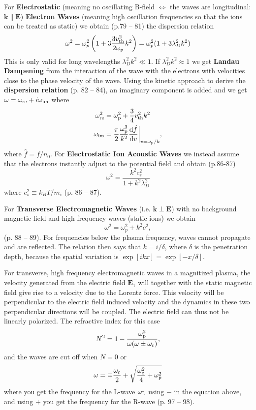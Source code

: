 \documentclass[10pt,landscape]{article}
\renewcommand{\vec}{\bm}
\newcommand{\topiccolor}{green}
\newcommand{\cbf}[1]{\textcolor{\topiccolor!80!black}{\textbf{#1}}}
\begin{document}
\begin{multicols*}{3}
For \cbf{Electrostatic} (meaning no oscillating B-field $\iff$ the waves
are longitudinal: $\vec k \parallel \vec E$)
\cbf{Electron Waves} (meaning high oscillation frequencies so that the ions
can be treated as static) we obtain (p.79 -- 81) the dispersion relation
\begin{equation*}
	\omega^2 = \omega_p^2 \left(1 + 3 \frac{3v_{\rm th}^2}{2 \omega_{\rm p}} k^2\right) = \omega_p^2 (1 + 3 \lambda_D^2 k^2)
\end{equation*}
This is only valid for long wavelengths $\lambda_D^2 k^2 \ll 1$.
If $\lambda_D^2 k^2 \approx 1$ we get \cbf{Landau Dampening}
from the interaction of the wave with the electrons with velocities close to the
phase velocity of the wave.
Using the kinetic approach to derive the \cbf{dispersion relation} (p. 82 -- 84), an imaginary
component is added and we get $\omega=\omega_{\rm re} + i\omega_{\rm im}$ where
\begin{align*}
	\omega_{\rm re}^2 &= \omega_{\rm p}^2 + \frac34 v_{\rm th}^2k^2 \\
	\omega_{\rm im} &= \frac\pi2 \frac{\omega_{\rm p}^3}{k^2}\diff{\hat{f}}{v}\biggr\rvert_{v=\omega_{\rm p}/k},
\end{align*}
where $\hat{f}=f/n_0$.
For \cbf{Electrostatic Ion Acoustic Waves} we instead assume that the electrons
instantly adjust to the potential field and obtain (p.86-87)
\[
	\omega^2 = \frac{k^2 c_s^2}{1+k^2 \lambda_D^2}
\]
where $c_s^2 \equiv k_BT/m_i$ (p. 86 -- 87).

For \cbf{Transverse Electromagnetic Waves} (i.e. $\vec k \perp \vec E$)
with no background magnetic field and high-frequency waves (static ions)
we obtain 
\begin{equation*}
	\omega^2 = \omega_p^2 +  k^2 c^2,
\end{equation*}
(p. 88 -- 89).
For frequencies below the plasma frequency, waves cannot propagate and are
reflected.
The relation then says that $k = i / \delta$,
where $\delta$ is the penetration depth, because the spatial variation is
$\exp[ikx] = \exp[-x/\delta]$.

For transverse, high frequency electromagnetic waves in a magnitized plasma, the velocity generated from the electric field $\vec E_1$ will together with the static magnetic field give rise to a velocity due to the Lorentz force. 
This velocity will be  perpendicular to the electric field induced velocity and the dynamics in these two perpendicular directions will be coupled. 
The electric field can thus not be linearly polarized.
The refractive index for this case 
\begin{equation*}
	N^2 = 1 - \frac{\omega_{\rm p}^2}{\omega(\omega \pm \omega_{\rm c})},
\end{equation*}
and the waves are cut off when $N=0$ or 
\begin{equation}
	\omega = \mp \frac{\omega_{\rm c}}{2}+\sqrt{\frac{\omega_{\rm c}^2}{4}+\omega_{\rm p}^2}
\end{equation}
where you get the frequency for the L-wave $\omega_{\rm L}$ using $-$ in the equation above, and using $+$ you get the frequency for the R-wave (p. 97 -- 98).


\end{multicols*}
\end{document}
